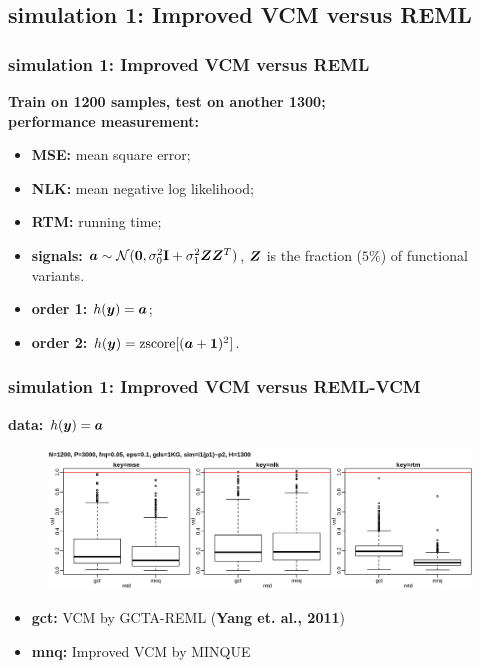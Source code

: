 \documentclass{beamer}
\begin{document}
\subsection{simulation 1: Improved VCM versus REML}
\begin{frame}\frametitle{simulation 1: Improved VCM versus REML}
  \textbf{Train on 1200 samples, test on another 1300;} \\
  {\color{blue}\textbf{performance measurement:}}
  \begin{itemize}
  \item \textbf{MSE:} mean square error;
  \item \textbf{NLK:} mean negative log likelihood;
  \item \textbf{RTM:} running time;
  \end{itemize}
  \begin{itemize}
  \item \textbf{signals:} ${\bm{a}} \sim \mathcal{N}(\bm{0}, \sigma_0^2\textbf{I} + \sigma_1^2{\bm{Z}}{\bm{Z}}^T)$,
    ${\bm{Z}}$ is the fraction ($5\%$) of functional variants.
  \item \textbf{order 1:} $h({\bm{y}})={\bm{a}}$;
  \item \textbf{order 2:} $h({\bm{y}})=\text{zscore}[({\bm{a}} + \mathbf{1})^2]$.
  \end{itemize}
\end{frame}
\begin{frame}\frametitle{simulation 1: Improved VCM versus REML-VCM}
  \textbf{data: $h({\bm{y}})={\bm{a}}$} \\
  \begin{figure}
    \centering \includegraphics[width=.95\linewidth]{img/1kg_whl_p01}
  \end{figure}
  \textbf{\color{blue}{inner plot: strategies, from left to right:}}
  \begin{itemize}
  \item \textbf{gct:} VCM by GCTA-REML (\textbf{Yang et. al., 2011})
  \item \textbf{mnq:} Improved VCM by MINQUE
  \end{itemize}
\end{frame}
\end{document}

